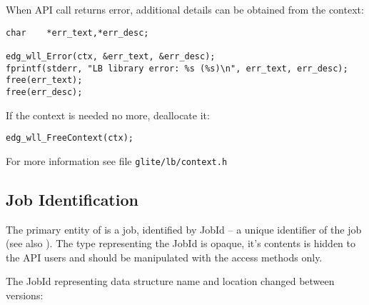 
When \LB API call returns error, additional details can be obtained
from the context:
\begin{lstlisting}
char    *err_text,*err_desc;
        
edg_wll_Error(ctx, &err_text, &err_desc);
fprintf(stderr, "LB library error: %s (%s)\n", err_text, err_desc);
free(err_text);
free(err_desc);
\end{lstlisting}

If the context is needed no more, deallocate it:
\begin{lstlisting}
edg_wll_FreeContext(ctx);
\end{lstlisting}

For more information see file \texttt{glite/lb/context.h}

\subsection{Job Identification} 
The primary entity of \LB is a job, identified by JobId -- a unique
identifier of the job (see also \cite{LBUG}). The type representing
the JobId is opaque, it's contents is hidden to the API users and
should be manipulated with the access methods only.

The JobId representing data structure name and location
changed between \LB versions:

